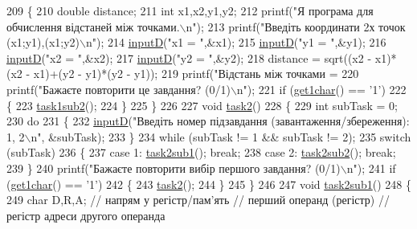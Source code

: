 \begin{DoxyCodeInclude}
{{{{{209 \{
210     \textcolor{keywordtype}{double} distance;
211     \textcolor{keywordtype}{int} x1,x2,y1,y2;
212     printf(\textcolor{stringliteral}{"Я програма для обчислення відстаней між точками.\(\backslash\)n"});
213     printf(\textcolor{stringliteral}{"Введіть координати 2х точок (x1;y1),(x1;y2)\(\backslash\)n"});
214     \hyperlink{main_8c_aa9f623385e5c1c8ac44a985d44cf3c5a}{inputD}(\textcolor{stringliteral}{"x1 = "},&x1);
215     \hyperlink{main_8c_aa9f623385e5c1c8ac44a985d44cf3c5a}{inputD}(\textcolor{stringliteral}{"y1 = "},&y1);
216     \hyperlink{main_8c_aa9f623385e5c1c8ac44a985d44cf3c5a}{inputD}(\textcolor{stringliteral}{"x2 = "},&x2);
217     \hyperlink{main_8c_aa9f623385e5c1c8ac44a985d44cf3c5a}{inputD}(\textcolor{stringliteral}{"y2 = "},&y2);
218     distance = sqrt((x2 - x1)*(x2 - x1)+(y2 - y1)*(y2 - y1));
219     printf(\textcolor{stringliteral}{"Відстань між точками = %
220     printf(\textcolor{stringliteral}{"Бажаєте повторити це завдання? (0/1)\(\backslash\)n"});
221     \textcolor{keywordflow}{if} (\hyperlink{main_8c_a20531ce01d5668d3c0eafb037eb3c514}{get1char}() == \textcolor{charliteral}{'1'})
222     \{
223         \hyperlink{main_8c_ab6b6fe73040966990d9129dbf55cb110}{task1sub2}();
224     \}
225 \}
226 
227 \textcolor{keywordtype}{void} \hyperlink{main_8c_afb35a54f26606b4808ac0a8d9ad55433}{task2}()
228 \{
229     \textcolor{keywordtype}{int} subTask = 0;
230     \textcolor{keywordflow}{do}
231     \{
232         \hyperlink{main_8c_aa9f623385e5c1c8ac44a985d44cf3c5a}{inputD}(\textcolor{stringliteral}{"Введіть номер підзавдання (завантаження/збереження): 1, 2\(\backslash\)n"}, &subTask);
233     \}
234     \textcolor{keywordflow}{while} (subTask != 1 && subTask != 2);
235     \textcolor{keywordflow}{switch} (subTask)
236     \{
237         \textcolor{keywordflow}{case} 1: \hyperlink{main_8c_a49562a6161d394ce5f96b6731e07e440}{task2sub1}(); \textcolor{keywordflow}{break};
238         \textcolor{keywordflow}{case} 2: \hyperlink{main_8c_a08a44a4f43367b221db5d4e7b2657623}{task2sub2}(); \textcolor{keywordflow}{break};
239     \}
240     printf(\textcolor{stringliteral}{"Бажаєте повторити вибір першого завдання? (0/1)\(\backslash\)n"});
241     \textcolor{keywordflow}{if} (\hyperlink{main_8c_a20531ce01d5668d3c0eafb037eb3c514}{get1char}() == \textcolor{charliteral}{'1'})
242     \{
243         \hyperlink{main_8c_afb35a54f26606b4808ac0a8d9ad55433}{task2}();
244     \}
245 \}
246 
247 \textcolor{keywordtype}{void} \hyperlink{main_8c_a49562a6161d394ce5f96b6731e07e440}{task2sub1}()
248 \{
249     \textcolor{keywordtype}{char} D,R,A; \textcolor{comment}{// напрям у регістр/пам'ять // перший операнд (регістр) // регістр адреси другого операнда}
}}}}}}
\end{DoxyCodeInclude}
